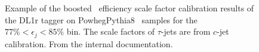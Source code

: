 \begin{figure}
    \caption{ Example of the boosted \vhb\ efficiency scale factor calibration results of the DL1r tagger on PowhegPythia8 \ttb\ samples for the $77\%<\epsilon_j<85\%$ bin. The scale factors of $\tau$-jets are from $c$-jet calibration. From the internal documentation.}
    \label{appfig:FTAG_calibration_boosted}
\end{figure}


\clearpage